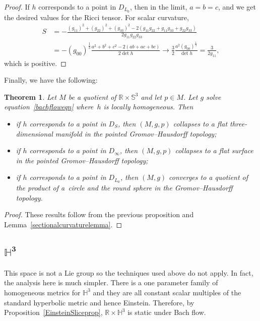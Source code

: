 \documentclass[10pt,a4paper]{amsart}
\numberwithin{equation}{section}
\newtheorem{Theorem}{Theorem}[section]
\begin{document}
\begin{proof}
If $h$ corresponds to a point in $D_{L_0}$, then in the limit, $a = b = c$, and we get the desired values for the Ricci tensor. For scalar curvature,
\begin{align*}
S &= - \frac{(g_{11})^2 + (g_{22})^2+(g_{33})^2 - 2(g_{11} g_{22} + g_{11} g_{33} + g_{22} g_{33})}
			{2 g_{11} g_{22} g_{33}} \\
	&= -(g_{00})^{\frac{1}{3}} \frac{a^2 + b^2 + c^2 - 2(ab + ac + bc)}{2 \det h}
	\rightarrow \frac{3}{2} \frac{a^2 (g_{00})^{\frac{1}{3}}}{\det h}
	= \frac{3}{2 g_{11}},
\end{align*}
which is positive. %
\end{proof}

Finally, we have the following:

\begin{Theorem} \label{s3convergencethm}Let $M$ be a quotient of $\mathbb{R} \times \mathbb{S}^3$ and let $p \in M$. Let $g$ solve equation~\eqref{bachfloweqn} where~$h$ is locally homogeneous. Then
\begin{itemize}\itemsep=0pt
\item if $h$ corresponds to a point in $D_S$, then $(M, g, p)$ collapses to a flat three-dimensional manifold in the pointed Gromov--Hausdorff topology;
\item if $h$ corresponds to a point in $D_{\infty}$, then $(M, g, p)$ collapses to a flat surface in the pointed Gromov--Hausdorff topology;
\item if $h$ corresponds to a point in $D_{L_0}$, then $(M, g)$ converges to a quotient of the product of a~circle and the round sphere in the Gromov--Hausdorff topology.
\end{itemize}
\end{Theorem}

\begin{proof}These results follow from the previous proposition and Lemma~\ref{sectionalcurvaturelemma}.
\end{proof}

\subsection[$\mathbb{H}^3$]{$\boldsymbol{\mathbb{H}^3}$} This space is not a Lie group so the techniques used above do not apply. In fact, the analysis here is much simpler. There is a one parameter family of homogeneous metrics for $\mathbb{H}^3$ and they are all constant scalar multiples of the standard hyperbolic metric and hence Einstein. Therefore, by Proposition~\ref{EinsteinSliceprop}, $\mathbb{R} \times \mathbb{H}^3$ is static under Bach flow.
\end{document}
